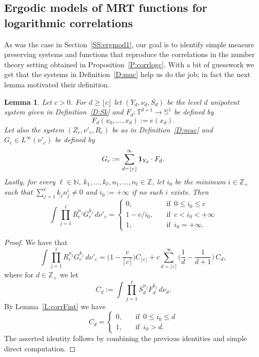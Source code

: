 \documentclass[11pt]{amsart}
\newtheorem{lemma}{Lemma}[section]
\theoremstyle{definition}
\newcommand{\N}{{\mathbb N}}
\renewcommand{\S}{\mathbb{S}}
\newcommand{\T}{{\mathbb T}}
\newcommand{\Z}{{\mathbb Z}}
\begin{document}
	 		 \subsection{Ergodic models of  MRT functions for logarithmic correlations} 		
	 As was the case in Section~\ref{SS:ergmod1}, our goal is to
	 		  identify simple measure preserving systems and functions that reproduce the correlations
	 		  in the number theory setting obtained in Proposition~\ref{P:corrlogc}.  With a bit of guesswork we
get that the systems in 	 		  Definition~\ref{D:muc} help us do the job; in fact the next lemma motivated their  definition.
	 		 \begin{lemma}\label{L:corrF'}
	 		 	Let $c>0$. For $d\geq \lfloor c \rfloor$ let  $(Y_d,\nu_d,S_d)$ be the level $d$ unipotent system given in  Definition~\ref{D:Sk}
	 		 	 and
	 		 	$F_d\colon \T^{d+1}\to \S^1$ be defined by
	 		 	$$
	 		 	F_d(x_0,\ldots, x_d):=e(x_d).
	 		 	$$
	 		 Let also the  system
	 		 	$(Z_c,\nu'_c, R_c)$ be as in Definition~\ref{D:muc} and
	 		  $G_c\in L^\infty(\nu'_c)$ be  defined by
	 		 	$$
	 		 	G_c:=\sum_{d= \lfloor c\rfloor }^\infty   {\bf 1}_{Y_d}\cdot F_d.
	 		 	$$
	 		 	Lastly, for every $\ell\in\N$, $k_1,\ldots, k_\ell, n_1,\ldots, n_\ell \in \Z$,
	 let  $i_0$ be the minimum $i\in \Z_+$
	 such that $\sum_{j=1}^\ell k_j n_j^i\neq  0$ and $i_0:=+\infty$ if no such   $i$ exists.
	 Then
	 		 	$$
	 		 	\int \prod_{j=1}^\ell R_c^{n_j}G_c^{k_j}\, d\nu'_c=\begin{cases}
	 		 		0, & \quad \text{if }\,  0\leq i_0\leq c\\
	 		 		1-c/i_0, & \quad   \text{if }\,  c<i_0<+\infty  \\
	 		 		1, & \quad \text{if } \, i_0=+\infty.
	 		 	\end{cases}
	 		 	$$
	 		 \end{lemma}
 		 \begin{proof}
We have that
$$ 	
 		 \int \prod_{j=1}^\ell R_c^{n_j}G_c^{k_j}\, d\nu'_c
 		=
 		 \Big(1-\frac{c}{\lceil c\rceil}\Big) C_{\lfloor c\rfloor }  +
 		 c\sum_{d=\lceil c\rceil}^\infty  \Big(\frac{1}{d}-\frac{1}{d+1}\Big)\,  C_d,
 $$
 	where for $d\in\Z_+$ we let
 	 $$
 	 	  C_d:=\int \prod_{j=1}^\ell S_d^{n_j}F_d^{k_j}\, d\nu_d.
 	 	  $$
 By  Lemma~\ref{L:corrFint} we have
$$
C_d 	 	 = \begin{cases}
 	 	  	0, & \quad \text{if }\,  0\leq i_0\leq d\\
 	 	  	1, & \quad \text{if } \, i_0>d.
 	 	  \end{cases}%
 	 $$		
The  asserted identity follows by combining the previous identities and simple direct computation.
  \end{proof}
\end{document}
